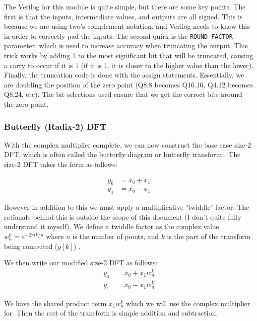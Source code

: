 \documentclass[12pt]{article}
\begin{document}
The Verilog for this module is quite simple, but there are some key points. The
first is that the inputs, intermediate values, and outputs are all signed. This
is because we are using two's complement notation, and Verilog needs to know
this in order to correctly pad the inputs. The second quirk is the
\texttt{ROUND\_FACTOR} parameter, which is used to increase accuracy when
truncating the output. This trick works by adding 1 to the most significant bit
that will be truncated, causing a carry to occur if it is 1 (if it is 1, it is
closer to the higher value than the lower). Finally, the truncation code is
done with the assign statements. Essentially, we are doubling the position of
the zero point (Q8.8 becomes Q16.16, Q4.12 becomes Q8.24, etc). The bit
selections used ensure that we get the correct bits around the zero-point.


\subsubsection{Butterfly (Radix-2) DFT}
With the complex multiplier complete, we can now construct the base case size-2
DFT, which is often called the butterfly diagram or butterfly transform
\cite{oppenheim1975digital}. The size-2 DFT takes the form as follows:

\begin{align*}
	y_0 &= x_0 + x_1 \\
	y_1 &= x_0 - x_1
\end{align*}

However in addition to this we must apply a multiplicative "twiddle" factor.
The rationale behind this is outside the scope of this document (I don't quite
fully understand it myself). We define a twiddle factor as the complex value
$w_n^k = e^{-2\pi i k / n}$ where $n$ is the number of points, and $k$ is the
part of the transform being computed ($y[k]$) \cite{oppenheim1975digital}.

We then write our modified size-2 DFT as follows:
\begin{align*}
	y_0 &= x_0 + x_1 w_n^k \\
	y_1 &= x_0 - x_1 w_n^k 
\end{align*}

We have the shared product term $x_1 w_n^k$ which we will use the complex
multiplier for. Then the rest of the transform is simple addition and
subtraction.
\end{document}
